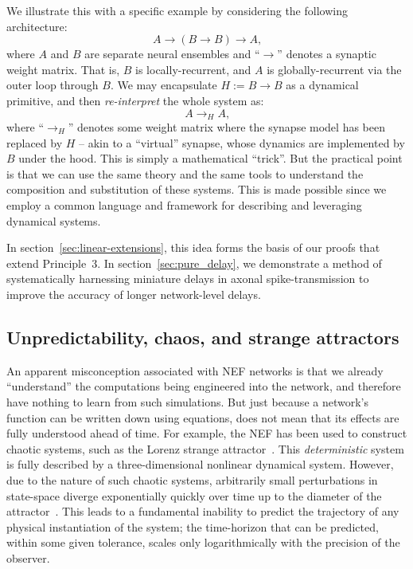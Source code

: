 We illustrate this with a specific example by considering the following architecture:
$$A \rightarrow (B \rightarrow B) \rightarrow A \text{,}$$
where $A$ and $B$ are separate neural ensembles and ``$\rightarrow$'' denotes a synaptic weight matrix.
That is, $B$ is locally-recurrent, and $A$ is globally-recurrent via the outer loop through $B$.
We may encapsulate $H := B \rightarrow B$ as a dynamical primitive, and then \emph{re-interpret} the whole system as:
$$A \rightarrow_H A \text{,}$$
where ``$\rightarrow_H$'' denotes some weight matrix where the synapse model has been replaced by $H$ --
akin to a ``virtual'' synapse, whose dynamics are implemented by $B$ under the hood.
This is simply a mathematical ``trick''.
But the practical point is that we can use the same theory and the same tools to understand the composition and substitution of these systems.
This is made possible since we employ a common language and framework for describing and leveraging dynamical systems.

In section~\ref{sec:linear-extensions}, this idea forms the basis of our proofs that extend Principle~3.
In section~\ref{sec:pure_delay}, we demonstrate a method of systematically harnessing miniature delays in axonal spike-transmission to improve the accuracy of longer network-level delays.


\subsection{Unpredictability, chaos, and strange attractors}

An apparent misconception associated with NEF networks is that we already ``understand'' the computations being engineered into the network, and therefore have nothing to learn from such simulations.
But just because a network's function can be written down using equations, does not mean that its effects are fully understood ahead of time.
For example, the NEF has been used to construct chaotic systems, such as the Lorenz strange attractor~\citep{eliasmith2005b}.
This \emph{deterministic} system is fully described by a three-dimensional nonlinear dynamical system.
However, due to the nature of such chaotic systems, arbitrarily small perturbations in state-space diverge exponentially quickly over time up to the diameter of the attractor~\citep[][pp.~328--330]{strogatz2000nonlinear}.
This leads to a fundamental inability to predict the trajectory of any physical instantiation of the system; the time-horizon that can be predicted, within some given tolerance, scales only logarithmically with the precision of the observer.

